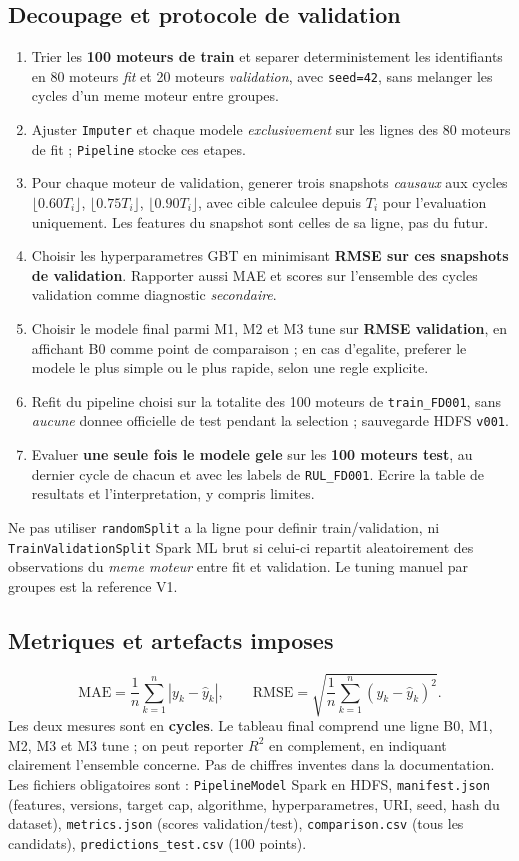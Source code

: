 \documentclass[10pt,a4paper]{article}
\newcommand{\code}[1]{{\small\ttfamily\nolinkurl{#1}}}
\begin{document}
\subsection{Decoupage et protocole de validation}
\begin{enumerate}
\item Trier les \textbf{100 moteurs de train} et separer deterministement les identifiants en 80 moteurs \emph{fit} et 20 moteurs \emph{validation}, avec \code{seed=42}, sans melanger les cycles d'un meme moteur entre groupes.
\item Ajuster \code{Imputer} et chaque modele \emph{exclusivement} sur les lignes des 80 moteurs de fit ; \code{Pipeline} stocke ces etapes.
\item Pour chaque moteur de validation, generer trois snapshots \emph{causaux} aux cycles \(\lfloor 0.60T_i\rfloor\), \(\lfloor 0.75T_i\rfloor\), \(\lfloor 0.90T_i\rfloor\), avec cible calculee depuis \(T_i\) pour l'evaluation uniquement. Les features du snapshot sont celles de sa ligne, pas du futur.
\item Choisir les hyperparametres GBT en minimisant \textbf{RMSE sur ces snapshots de validation}. Rapporter aussi MAE et scores sur l'ensemble des cycles validation comme diagnostic \emph{secondaire}.
\item Choisir le modele final parmi M1, M2 et M3 tune sur \textbf{RMSE validation}, en affichant B0 comme point de comparaison ; en cas d'egalite, preferer le modele le plus simple ou le plus rapide, selon une regle explicite.
\item Refit du pipeline choisi sur la totalite des 100 moteurs de \code{train_FD001}, sans \emph{aucune} donnee officielle de test pendant la selection ; sauvegarde HDFS \code{v001}.
\item Evaluer \textbf{une seule fois le modele gele} sur les \textbf{100 moteurs test}, au dernier cycle de chacun et avec les labels de \code{RUL_FD001}. Ecrire la table de resultats et l'interpretation, y compris limites.
\end{enumerate}
Ne pas utiliser \code{randomSplit} a la ligne pour definir train/validation, ni \code{TrainValidationSplit} Spark ML brut si celui-ci repartit aleatoirement des observations du \emph{meme moteur} entre fit et validation. Le tuning manuel par groupes est la reference V1.

\subsection{Metriques et artefacts imposes}
\[
\mathrm{MAE}=\frac{1}{n}\sum_{k=1}^n|y_k-\widehat{y}_k|,
\qquad
\mathrm{RMSE}=\sqrt{\frac{1}{n}\sum_{k=1}^n(y_k-\widehat{y}_k)^2}.
\]
Les deux mesures sont en \textbf{cycles}. Le tableau final comprend une ligne B0, M1, M2, M3 et M3 tune ; on peut reporter \(R^2\) en complement, en indiquant clairement l'ensemble concerne. Pas de chiffres inventes dans la documentation. Les fichiers obligatoires sont : \code{PipelineModel} Spark en HDFS, \code{manifest.json} (features, versions, target cap, algorithme, hyperparametres, URI, seed, hash du dataset), \code{metrics.json} (scores validation/test), \code{comparison.csv} (tous les candidats), \code{predictions_test.csv} (100 points).
\end{document}
